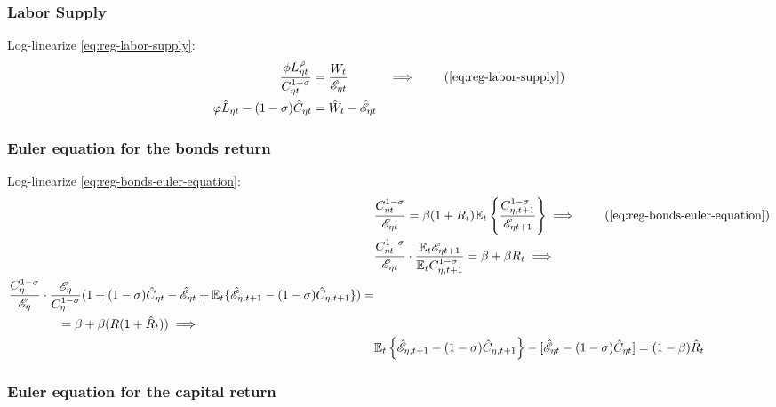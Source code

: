 \documentclass[../thesis.tex]{subfiles}
\begin{document}

\subsubsection*{Labor Supply}

Log-linearize \ref{eq:reg-labor-supply}:
\begin{alignat}{2}
	\frac{\phi L_{\eta t}^{\varphi}}{C_{\eta t}^{1-\sigma}} &= \frac{W_t}{\te} &\implies \tag{\ref{eq:reg-labor-supply}} \\
	\varphi \hat{L}_{\eta t} - (1 -\sigma) \hat{C}_{\eta t} &= \hat{W}_t - \hat{ \mathscr{E} }_{\eta t} & \label{eq:reg-ll-labor-supply}
\end{alignat}


\subsubsection*{Euler equation for the bonds return}

Log-linearize \ref{eq:reg-bonds-euler-equation}:
\begin{alignat}{2}
	& \frac{ C_{\eta t}^{1-\sigma}}{ \te} = \beta (1 + R_{t}) \E \left\{ \frac{ C_{\eta, t+1}^{1-\sigma}}{ \te[t+1]} \right\} \implies \tag{\ref{eq:reg-bonds-euler-equation}}\\
	& \frac{ C_{\eta t}^{1-\sigma}}{\te} \cdot \frac{\E \te[t+1]}{\E C_{\eta, t+1}^{1-\sigma}} = \beta + \beta R_{t} \implies \nonumber \\
	\begin{split}
		& \frac{C_{\eta}^{1-\sigma}}{\te[]} \cdot \frac{\te[]}{C_{\eta}^{1-\sigma}} (1 + (1-\sigma) \hat{C}_{\eta t} - \hat{\mathscr{E}}_{\eta t} + \E \{ \hat{\mathscr{E}}_{\eta, t+1} - (1 -\sigma) \hat{C}_{\eta, t+1} \}) = \\ & \qquad \qquad = \beta + \beta (R(1 + \hat{R}_{t})) \implies
	\end{split} \nonumber \\
	& \E \left\{ \hat{\mathscr{E}}_{\eta, t+1} - (1 -\sigma) \hat{C}_{\eta, t+1} \right\} - [\hat{\mathscr{E}}_{\eta t} - (1 -\sigma) \hat{C}_{\eta t}] = (1 -\beta) \hat{R}_{t} \label{eq:reg-ll-bonds-euler-equation}
\end{alignat}


\subsubsection*{Euler equation for the capital return}
\end{document}
